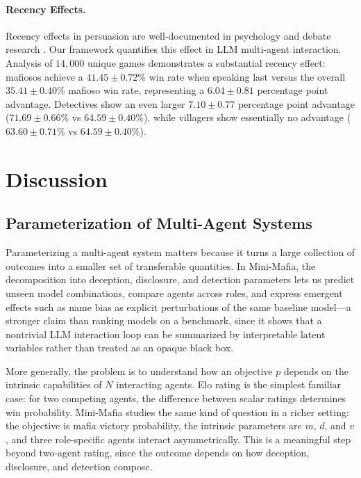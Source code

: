 \documentclass{article}
\begin{document}
\paragraph{Recency Effects.}

Recency effects in persuasion are well-documented in psychology and debate research \citep{miller1964}. Our framework quantifies this effect in LLM multi-agent interaction. Analysis of $14,000$ unique games demonstrates a substantial recency effect: mafiosos achieve a $41.45 \pm 0.72\%$ win rate when speaking last versus the overall $35.41 \pm 0.40\%$ mafioso win rate, representing a $6.04 \pm 0.81$ percentage point advantage. Detectives show an even larger $7.10 \pm 0.77$ percentage point advantage ($71.69 \pm 0.66\%$ vs $64.59 \pm 0.40\%$), while villagers show essentially no advantage ($63.60 \pm 0.71\%$ vs $64.59 \pm 0.40\%$).


\section{Discussion}
\label{sec:discussion}

\subsection{Parameterization of Multi-Agent Systems}

Parameterizing a multi-agent system matters because it turns a large collection of outcomes into a smaller set of transferable quantities. In Mini-Mafia, the decomposition into deception, disclosure, and detection parameters lets us predict unseen model combinations, compare agents across roles, and express emergent effects such as name bias as explicit perturbations of the same baseline model---a stronger claim than ranking models on a benchmark, since it shows that a nontrivial LLM interaction loop can be summarized by interpretable latent variables rather than treated as an opaque black box.

More generally, the problem is to understand how an objective $p$ depends on the intrinsic capabilities of $N$ interacting agents. Elo rating is the simplest familiar case: for two competing agents, the difference between scalar ratings determines win probability. Mini-Mafia studies the same kind of question in a richer setting: the objective is mafia victory probability, the intrinsic parameters are $m$, $d$, and $v$, and three role-specific agents interact asymmetrically. This is a meaningful step beyond two-agent rating, since the outcome depends on how deception, disclosure, and detection compose.
\end{document}
